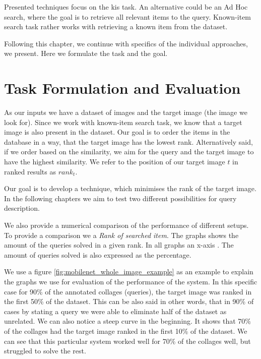 Presented techniques focus on the \acrlong{kis} task. An alternative could be an Ad Hoc search, where the goal is to retrieve all relevant items to the query. Known-item search task rather works with retrieving a known item from the dataset.

Following this chapter, we continue with specifics of the individual approaches, we present. Here we formulate the task and the goal.

\section*{Task Formulation and Evaluation}

As our inputs we have a dataset of images and the target image (the image we look for). Since we work with known-item search task, we know that a target image is also present in the dataset. Our goal is to order the items in the database in a way, that the target image has the lowest rank. Alternatively said, if we order based on the similarity, we aim for the query and the target image to have the highest similarity. We refer to the position of our target image $t$ in ranked results as $rank_t$.

Our goal is to develop a technique, which minimises the rank of the target image. In the following chapters we aim to test two different possibilities for query description.

We also provide a numerical comparison of the performance of different setups. To provide a comparison we a \emph{Rank of searched item}. The graphs shows the amount of the queries solved in a given rank. In all graphs an x-axis  . The amount of queries solved is also expressed as the percentage.



We use a figure \ref{fig:mobilenet_whole_image_example} as an example to explain the graphs we use for evaluation of the performance of the system. In this specific case for 90\% of the annotated collages (queries), the target image was ranked in the first 50\% of the dataset. This can be also said in other words, that in 90\% of cases by stating a query we were able to eliminate half of the dataset as unrelated. We can also notice a steep curve in the beginning. It shows that 70\% of the collages had the target image ranked in the first 10\% of the dataset. We can see that this particular system worked well for 70\% of the collages well, but struggled to solve the rest.


